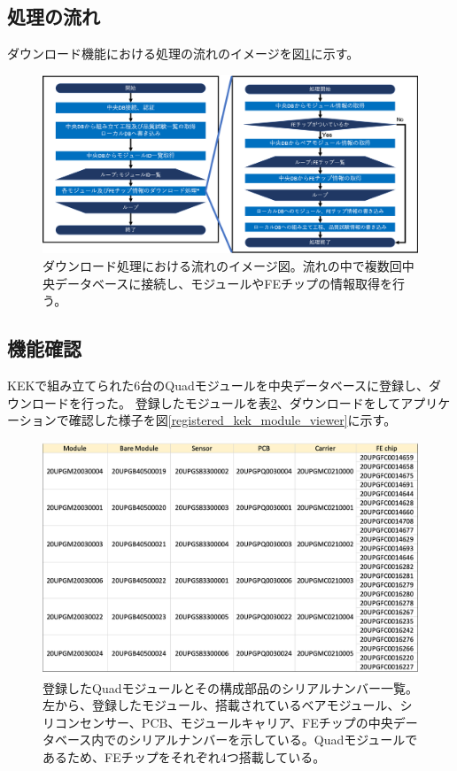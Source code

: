 \subsection{処理の流れ}

ダウンロード機能における処理の流れのイメージを図\ref{download_algorithm}に示す。

\begin{figure}[bpt]\centering
  \begin{center}
  \includegraphics[width=15cm]{./download_tool_flow_whole.png}
  \caption[ダウンロード処理における流れのイメージ図]{ダウンロード処理における流れのイメージ図。流れの中で複数回中央データベースに接続し、モジュールやFEチップの情報取得を行う。}
  \label{download_algorithm}
  \end{center}
\end{figure}

\subsection{機能確認}
KEKで組み立てられた6台のQuadモジュールを中央データベースに登録し、ダウンロードを行った。
登録したモジュールを表\ref{registered_kek_module}、ダウンロードをしてアプリケーションで確認した様子を図\ref{registered_kek_module_viewer}に示す。

\begin{figure}[bpt]\centering
\includegraphics[width=12cm]{./registered_kek_module.png}
\caption[登録したQuadモジュールと構成部品のシリアルナンバー一覧。]{登録したQuadモジュールとその構成部品のシリアルナンバー一覧。左から、登録したモジュール、搭載されているベアモジュール、シリコンセンサー、PCB、モジュールキャリア、FEチップの中央データベース内でのシリアルナンバーを示している。Quadモジュールであるため、FEチップをそれぞれ4つ搭載している。}
\label{registered_kek_module}
\end{figure}

